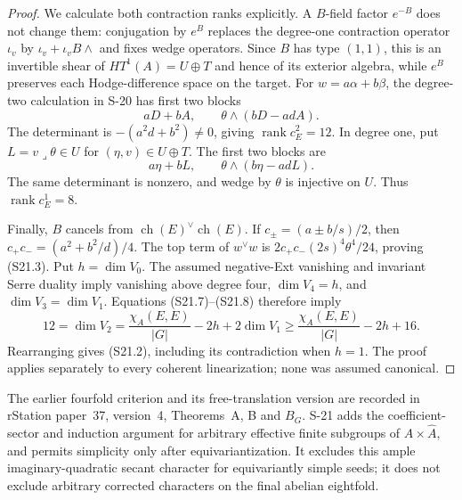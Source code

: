 \begin{proof}
We calculate both contraction ranks explicitly. A
$B$-field factor $e^{-B}$ does not change them:
conjugation by $e^B$ replaces the degree-one contraction
operator $\iota_v$ by $\iota_v+\iota_vB\wedge$ and fixes
wedge operators. Since $B$ has type $(1,1)$, this is an
invertible shear of $HT^1(A)=U\oplus T$ and hence of its
exterior algebra, while $e^B$ preserves each Hodge-difference
space on the target.
For $w=a\alpha+b\beta$, the degree-two calculation in S-20
has first two blocks
\[
 aD+bA,\qquad\theta\wedge(bD-adA).
\]
The determinant is $-(a^2d+b^2)\ne0$, giving
$\operatorname{rank}c_E^2=12$.
In degree one, put $L=v\mathbin{\lrcorner}\theta\in U$
for $(\eta,v)\in U\oplus T$.
The first two blocks are
\[
 a\eta+bL,\qquad\theta\wedge(b\eta-adL).
\]
The same determinant is nonzero, and wedge by $\theta$
is injective on $U$. Thus $\operatorname{rank}c_E^1=8$.

Finally, $B$ cancels from $\operatorname{ch}(E)^\vee
\operatorname{ch}(E)$. If
$c_\pm=(a\pm b/s)/2$, then
$c_+c_-=(a^2+b^2/d)/4$.
The top term of $w^\vee w$ is
$2c_+c_-(2s)^4\theta^4/24$, proving (S21.3).
Put $h=\dim V_0$. The assumed negative-Ext vanishing and
invariant Serre duality imply vanishing above degree four,
$\dim V_4=h$, and $\dim V_3=\dim V_1$.
Equations (S21.7)--(S21.8) therefore imply
\[
 12=\dim V_2
 =\frac{\chi_A(E,E)}{|G|}-2h+2\dim V_1
 \ge\frac{\chi_A(E,E)}{|G|}-2h+16.
\]
Rearranging gives (S21.2), including its contradiction
when $h=1$. The proof applies separately to every coherent
linearization; none was assumed canonical.
\end{proof}

The earlier fourfold criterion and its free-translation
version are recorded in rStation paper~37, version~4,
Theorems~A, B and $B_G$. S-21 adds the coefficient-sector
and induction argument for arbitrary effective finite
subgroups of $A\times\widehat A$, and permits simplicity
only after equivariantization. It excludes this ample
imaginary-quadratic secant character for equivariantly
simple seeds; it does not exclude arbitrary corrected
characters on the final abelian eightfold.

